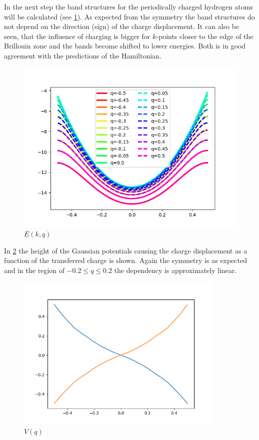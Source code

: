 In the next step the band structures for the periodically charged hydrogen atoms will be calculated (see \cref{image_hydrogen_charged_bands}). As expected from the symmetry the band structures do not depend on the direction (sign) of the charge displacement. It can also be seen, that the influence of charging is bigger for $k$-points closer to the edge of the Brillouin zone and the bands become shifted to lower energies. Both is in good agreement with the predictions of the Hamiltonian.

\begin{figure}
	\centering
	\includegraphics[width = 12cm]{Images/Hydrogen/hydrogen_charged_bands}
	\caption{$E(k, q)$}
	\label{image_hydrogen_charged_bands}
\end{figure}




In \cref{image_hydrogen_charge_potential} the height of the Gaussian potentials causing the charge displacement as a function of the transferred charge is shown. Again the symmetry is as expected and in the region of $-0.2 \le q \le 0.2$ the dependency is approximately linear.

\begin{figure}
	\centering
	\includegraphics[width = 10cm]{Images/Hydrogen/hydrogen_charge_potential}
	\caption{$V(q)$}
	\label{image_hydrogen_charge_potential}
\end{figure}

